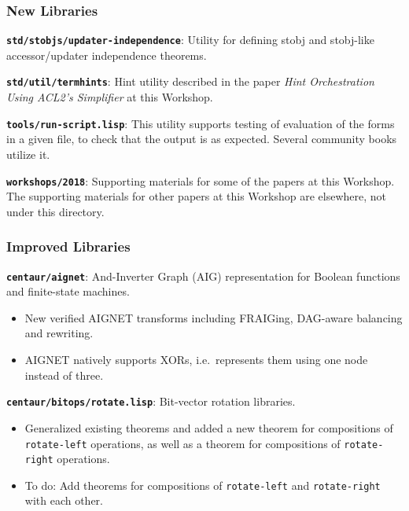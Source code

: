 \documentclass{beamer}
\newcommand{\code}[1]{\texttt{#1}}
\newcommand{\bookpath}[1]{\textbf{\code{#1}}}
\newcommand{\newlibtitle}{\frametitle{New Libraries}}
\newcommand{\implibtitle}{\frametitle{Improved Libraries}}
\newcommand{\separation}{\vspace*{1ex}}
\begin{document}

\begin{frame}

\newlibtitle

\bookpath{std/stobjs/updater-independence}:
Utility for defining stobj and stobj-like accessor/updater
independence theorems.

\separation

\bookpath{std/util/termhints}:
Hint utility described in the paper
\textit{Hint Orchestration Using ACL2's Simplifier}
at this Workshop.

\separation

\bookpath{tools/run-script.lisp}:
This utility supports testing of evaluation of the forms
in a given file, to check that the output is as expected.
Several community books utilize it.

\separation

\bookpath{workshops/2018}:
Supporting materials for some of the papers at this Workshop.
The supporting materials for other papers at this Workshop
are elsewhere, not under this directory.

\end{frame}


\begin{frame}

\implibtitle

\bookpath{centaur/aignet}:
And-Inverter Graph (AIG) representation
for Boolean functions and finite-state machines.
\begin{itemize}
\item
New verified AIGNET transforms including FRAIGing, DAG-aware balancing
and rewriting.
\item
AIGNET natively supports XORs, i.e.\ represents them using one node
instead of three.
\end{itemize}

\separation

\bookpath{centaur/bitops/rotate.lisp}:
Bit-vector rotation libraries.
\begin{itemize}
\item
Generalized existing theorems and added a new theorem for compositions
of \code{rotate-left} operations, as well as a theorem for
compositions of \code{rotate-right} operations.
\item
To do: Add theorems for compositions of \code{rotate-left} and
\code{rotate-right} with each other.
\end{itemize}

\end{frame}
\end{document}
